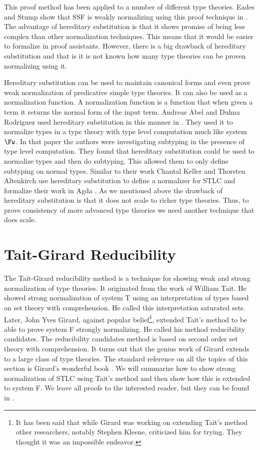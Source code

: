 This proof method has been applied to a number of different type
theories.  Eades and Stump show that SSF is weakly normalizing using
this proof technique in \cite{Eades:2010}.  The advantage of
hereditary substitution is that it shows promise of being less complex
than other normalization techniques.  This means that it would be
easier to formalize in proof assistants.  However, there is a big
drawback of hereditary substitution and that is it is not known how
many type theories can be proven normalizing using it.

Hereditary substitution can be used to maintain canonical forms and
even prove weak normalization of predicative simple type theories.  It
can also be used as a normalization function.  A normalization
function is a function that when given a term it returns the normal
form of the input term.  Andreas Abel and Dulma Rodriguez used
hereditary substitution in this manner in \cite{Abel:2008}.  They used
it to normalize types in a type theory with type level computation
much like system $\Fw$.  In that paper the authors were investigating
subtyping in the presence of type level computation.  They found that
hereditary substitution could be used to normalize types and then do
subtyping.  This allowed them to only define subtyping on normal
types.  Similar to their work Chantal Keller and Thorsten Altenkirch
use hereditary substitution to define a normalizer for STLC and
formalize their work in Agda \cite{Keller:2010}.
As we mentioned above the drawback of hereditary substitution is that
it does not scale to richer type theories.  Thus, to prove consistency
of more advanced type theories we need another technique that does
scale.

\section{Tait-Girard Reducibility}
\label{sec:tait-griard_reduciblity}
The Tait-Girard reducibility method is a technique for showing weak and
strong normalization of type theories.  It originated from the work of
William Tait.  He showed strong normalization of system T using an
interpretation of types based on set theory with comprehension.  He
called this interpretation saturated sets.  Later, John Yves Girard,
against popular belief\footnote{It has been said that while Girard was
  working on extending Tait's method other researchers, notably
  Stephen Kleene, criticized him for trying.  They thought it was an
  impossible endeavor.}, extended Tait's method to be able to prove
system F strongly normalizing.  He called his method reducibility
candidates. The reducibility candidates method is based on second order
set theory with comprehension.  It turns out that the genius work of
Girard extends to a large class of type theories. The standard
reference on all the topics of this section is Girard's wonderful book
\cite{Girard:1989}.  We will summarize how to show strong
normalization of STLC using Tait's method and then show how this is
extended to system F.  We leave all proofs to the interested reader,
but they can be found in \cite{Girard:1989}.

